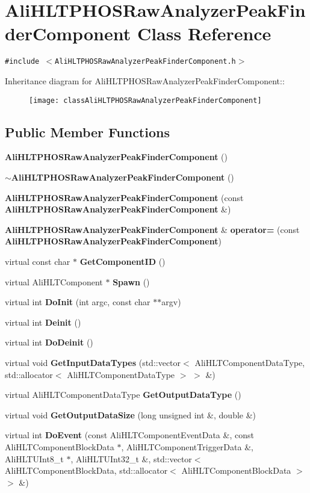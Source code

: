 \section{Ali\-HLTPHOSRaw\-Analyzer\-Peak\-Finder\-Component Class Reference}
\label{classAliHLTPHOSRawAnalyzerPeakFinderComponent}
{\tt \#include $<$Ali\-HLTPHOSRaw\-Analyzer\-Peak\-Finder\-Component.h$>$}

Inheritance diagram for Ali\-HLTPHOSRaw\-Analyzer\-Peak\-Finder\-Component::\begin{figure}[H]
\begin{center}
\leavevmode
\texttt{[image: classAliHLTPHOSRawAnalyzerPeakFinderComponent]}
\end{center}
\end{figure}
\subsection*{Public Member Functions}
\begin{CompactItemize}
\item 
{\bf Ali\-HLTPHOSRaw\-Analyzer\-Peak\-Finder\-Component} ()
\item 
{\bf $\sim$Ali\-HLTPHOSRaw\-Analyzer\-Peak\-Finder\-Component} ()
\item 
{\bf Ali\-HLTPHOSRaw\-Analyzer\-Peak\-Finder\-Component} (const {\bf Ali\-HLTPHOSRaw\-Analyzer\-Peak\-Finder\-Component} \&)
\item 
{\bf Ali\-HLTPHOSRaw\-Analyzer\-Peak\-Finder\-Component} \& {\bf operator=} (const {\bf Ali\-HLTPHOSRaw\-Analyzer\-Peak\-Finder\-Component})
\item 
virtual const char $\ast$ {\bf Get\-Component\-ID} ()
\item 
virtual Ali\-HLTComponent $\ast$ {\bf Spawn} ()
\item 
virtual int {\bf Do\-Init} (int argc, const char $\ast$$\ast$argv)
\item 
virtual int {\bf Deinit} ()
\item 
virtual int {\bf Do\-Deinit} ()
\item 
virtual void {\bf Get\-Input\-Data\-Types} (std::vector$<$ Ali\-HLTComponent\-Data\-Type, std::allocator$<$ Ali\-HLTComponent\-Data\-Type $>$ $>$ \&)
\item 
virtual Ali\-HLTComponent\-Data\-Type {\bf Get\-Output\-Data\-Type} ()
\item 
virtual void {\bf Get\-Output\-Data\-Size} (long unsigned int \&, double \&)
\item 
virtual int {\bf Do\-Event} (const Ali\-HLTComponent\-Event\-Data \&, const Ali\-HLTComponent\-Block\-Data $\ast$, Ali\-HLTComponent\-Trigger\-Data \&, Ali\-HLTUInt8\_\-t $\ast$, Ali\-HLTUInt32\_\-t \&, std::vector$<$ Ali\-HLTComponent\-Block\-Data, std::allocator$<$ Ali\-HLTComponent\-Block\-Data $>$ $>$ \&)
\end{CompactItemize}
